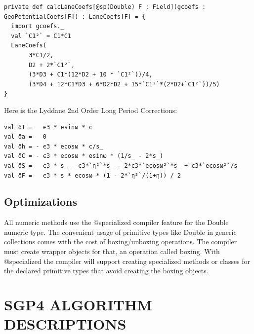\documentclass{article}
\begin{document}
\begin{lstlisting}[style=myScalastyle]
private def calcLaneCoefs[@sp(Double) F : Field](gcoefs : GeoPotentialCoefs[F]) : LaneCoefs[F] = {
  import gcoefs._
  val `C1²` = C1*C1
  LaneCoefs(
       3*C1/2,
       D2 + 2*`C1²`,
       (3*D3 + C1*(12*D2 + 10 * `C1²`))/4,
       (3*D4 + 12*C1*D3 + 6*D2*D2 + 15*`C1²`*(2*D2+`C1²`))/5)
}
\end{lstlisting}
Here is the Lyddane 2nd Order Long Period Corrections:
\begin{lstlisting}[style=myScalastyle]
val δI =   ϵ3 * esinω * c
val δa =   0
val δh = - ϵ3 * ecosω * c/s_
val δC = - ϵ3 * ecosω * esinω * (1/s_ - 2*s_)
val δS =   ϵ3 * s_ - ϵ3*`η²`*s_ - 2*ϵ3*`ecosω²`*s_ + ϵ3*`ecosω²`/s_
val δF =   ϵ3 * s * ecosω * (1 - 2*`η²`/(1+η)) / 2
\end{lstlisting}

\subsection{Optimizations}
\label{sec:optimizations}

All numeric methods use the @specialized compiler feature for the Double numeric type.
The convenient usage of primitive types like Double in generic collections comes with
the cost of boxing/unboxing operations. The compiler
must create wrapper objects for that, an operation called boxing. With @specialized
the compiler will support creating specialized methods or classes for the
declared primitive types that avoid creating the boxing objects.




\section{SGP4 ALGORITHM DESCRIPTIONS}
\label{sec:algorithms}

%
\end{document}

